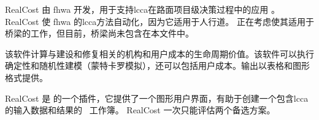 RealCost 由 \acrshort*{fhwa} 开发，用于支持\acrlong*{lcca}在路面项目级决策过程中的应用 \cite{fhwa2004r}。 RealCost 使 \acrshort*{fhwa} 的\acrlong*{lcca}方法自动化，因为它适用于人行道。 正在考虑使其适用于桥梁的工作，但目前，桥梁尚未包含在本文件中。

该软件计算与建设和修复相关的机构和用户成本的生命周期价值。该软件可以执行确定性和随机性建模（蒙特卡罗模拟），还可以包括用户成本。输出以表格和图形格式提供。

RealCost 是 \Microsoft[\Excel] 的一个插件，它提供了一个图形用户界面，有助于创建一个包含\acrlong*{lcca}的输入数据和结果的 \Excel\ 工作簿。 RealCost 一次只能评估两个备选方案。
